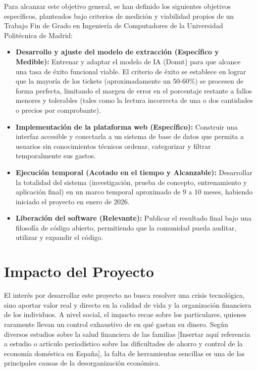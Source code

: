 \documentclass[%
    school=etsisi,%
    type=pfg,%
    degree=61CI,%
]{upm-report}
\begin{document}
Para alcanzar este objetivo general, se han definido los siguientes objetivos específicos, planteados bajo criterios de medición y viabilidad propios de un Trabajo Fin de Grado en Ingeniería de Computadores de la Universidad Politécnica de Madrid:

\begin{itemize}
    \item \textbf{Desarrollo y ajuste del modelo de extracción (Específico y Medible):} Entrenar y adaptar el modelo de IA (Donut) para que alcance una tasa de éxito funcional viable. El criterio de éxito se establece en lograr que la mayoría de los tickets (aproximadamente un 50-60\%) se procesen de forma perfecta, limitando el margen de error en el porcentaje restante a fallos menores y tolerables (tales como la lectura incorrecta de una o dos cantidades o precios por comprobante).
    \item \textbf{Implementación de la plataforma web (Específico):} Construir una interfaz accesible y conectarla a un sistema de base de datos que permita a usuarios sin conocimientos técnicos ordenar, categorizar y filtrar temporalmente sus gastos.
    \item \textbf{Ejecución temporal (Acotado en el tiempo y Alcanzable):} Desarrollar la totalidad del sistema (investigación, prueba de concepto, entrenamiento y aplicación final) en un marco temporal aproximado de 9 a 10 meses, habiendo iniciado el proyecto en enero de 2026.
    \item \textbf{Liberación del software (Relevante):} Publicar el resultado final bajo una filosofía de código abierto, permitiendo que la comunidad pueda auditar, utilizar y expandir el código.
\end{itemize}

\section{Impacto del Proyecto}
El interés por desarrollar este proyecto no busca resolver una crisis tecnológica, sino aportar valor real y directo en la calidad de vida y la organización financiera de los individuos. A nivel social, el impacto recae sobre los particulares, quienes raramente llevan un control exhaustivo de en qué gastan su dinero. Según diversos estudios sobre la salud financiera de las familias [Insertar aquí referencia a estudio o artículo periodístico sobre las dificultades de ahorro y control de la economía doméstica en España], la falta de herramientas sencillas es una de las principales causas de la desorganización económica.
\end{document}
